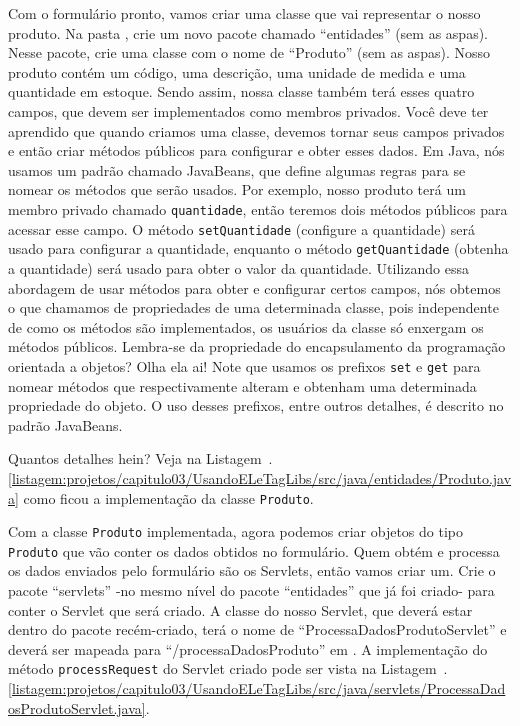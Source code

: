 Com o formulário pronto, vamos criar uma classe que vai representar o nosso produto. Na pasta , crie um novo pacote chamado ``entidades'' (sem as aspas). Nesse pacote, crie uma classe com o nome de ``Produto'' (sem as aspas). Nosso produto contém um código, uma descrição, uma unidade de medida e uma quantidade em estoque. Sendo assim, nossa classe também terá esses quatro campos, que devem ser implementados como membros privados. Você deve ter aprendido que quando criamos uma classe, devemos tornar seus campos privados e então criar métodos públicos para configurar e obter esses dados. Em Java, nós usamos um padrão chamado JavaBeans, que define algumas regras para se nomear os métodos que serão usados. Por exemplo, nosso produto terá um membro privado chamado \texttt{quantidade}, então teremos dois métodos públicos para acessar esse campo. O método \texttt{setQuantidade} (configure a quantidade) será usado para configurar a quantidade, enquanto o método \texttt{getQuantidade} (obtenha a quantidade) será usado para obter o valor da quantidade. Utilizando essa abordagem de usar métodos para obter e configurar certos campos, nós obtemos o que chamamos de propriedades de uma determinada classe, pois independente de como os métodos são implementados, os usuários da classe só enxergam os métodos públicos. Lembra-se da propriedade do encapsulamento da programação orientada a objetos? Olha ela ai! Note que usamos os prefixos \texttt{set} e \texttt{get} para nomear métodos que respectivamente alteram e obtenham uma determinada propriedade do objeto. O uso desses prefixos, entre outros detalhes, é descrito no padrão JavaBeans.

Quantos detalhes hein? Veja na Listagem~\thechapter.\ref{listagem:projetos/capitulo03/UsandoELeTagLibs/src/java/entidades/Produto.java} como ficou a implementação da classe \texttt{Produto}.


Com a classe \texttt{Produto} implementada, agora podemos criar objetos do tipo \texttt{Produto} que vão conter os dados obtidos no formulário. Quem obtém e processa os dados enviados pelo formulário são os Servlets, então vamos criar um. Crie o pacote ``servlets'' -no mesmo nível do pacote ``entidades'' que já foi criado- para conter o Servlet que será criado. A classe do nosso Servlet, que deverá estar dentro do pacote recém-criado, terá o nome de ``ProcessaDadosProdutoServlet'' e deverá ser mapeada para ``/processaDadosProduto'' em . A implementação do método \texttt{processRequest} do Servlet criado pode ser vista na Listagem~\thechapter.\ref{listagem:projetos/capitulo03/UsandoELeTagLibs/src/java/servlets/ProcessaDadosProdutoServlet.java}.

